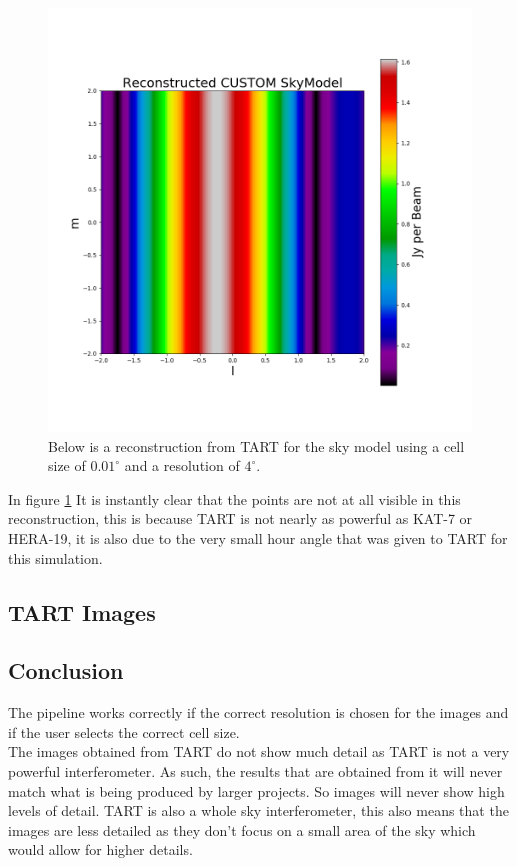 \begin{figure}[H]
    \centering
    \includegraphics[scale=0.4]{images/RECON_TART_4_POINT.png}
    \caption{Below is a reconstruction from TART for the sky model using a cell size of $0.01^\circ$ and a resolution of $4^\circ$.}
    \label{fig:TART_recon}
\end{figure}

In figure \ref{fig:TART_recon} It is instantly clear that the points are not at all visible in this reconstruction, this is because TART is not nearly as powerful as KAT-7 or HERA-19, it is also due to the very small hour angle that was given to TART for this simulation.

\subsection{TART Images}

\subsection{Conclusion}
The pipeline works correctly if the correct resolution is chosen for the images and if the user selects the correct cell size.\\
The images obtained from TART do not show much detail as TART is not a very powerful interferometer. As such, the results that are obtained from it will never match what is being produced by larger projects. So images will never show high levels of detail. TART is also a whole sky interferometer, this also means that the images are less detailed as they don't focus on a small area of the sky which would allow for higher details.

